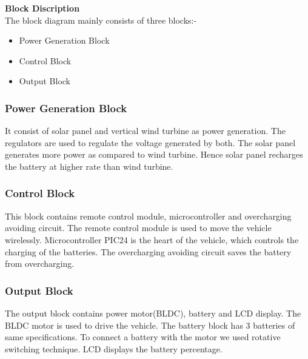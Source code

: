 \documentclass[a4paper,12pt]{article}
\begin{document}
\newpage
\textbf{Block Discription}\\[1cm]
The block diagram mainly consists of three blocks:-
\begin{itemize}
\item Power Generation Block
\item Control Block
\item Output Block
\end{itemize}
\subsubsection{Power Generation Block}
It consist of solar panel and vertical wind turbine as power generation. The regulators are used to regulate the voltage generated by both. The solar panel generates more power as compared to wind turbine. Hence solar panel recharges the battery at higher rate than wind turbine.

\subsubsection{Control Block}
This block contains remote control module, microcontroller and overcharging avoiding circuit. The remote control module is used to move the vehicle wirelessly. Microcontroller PIC24 is the heart of the vehicle, which controls the charging of the batteries. The overcharging avoiding circuit saves the battery from overcharging.

\subsubsection{Output Block}
The output block contains power motor(BLDC), battery and LCD display. The BLDC motor is used to drive the vehicle. The battery block has 3 batteries of same specifications. To connect a battery with the motor we used rotative switching technique. LCD displays the battery percentage.

\newpage
\end{document}
